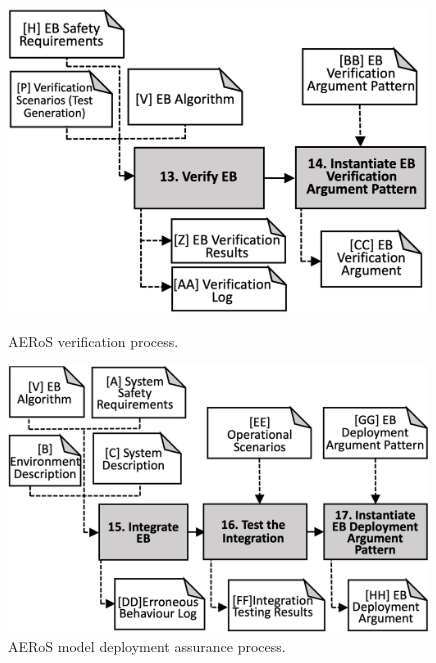 \documentclass[runningheads]{llncs}
\begin{document}
\vspace{-4ex}
\begin{figure}[!h]
\centering
\begin{minipage}{.5\textwidth}
	\centering
	\includegraphics[width=0.99\textwidth]{figures/AMLAS-STAGE-5-V4.png}%
	\vspace{-2ex}
	\caption{AERoS verification process.}
	\label{amlas-a-stage5}
\end{minipage}%
\begin{minipage}{.5\textwidth}
	\centering
	\includegraphics[width=0.99\textwidth]{figures/AMLAS-STAGE-6-V5.png}%
	\vspace{-2ex}
	\caption{AERoS model deployment assurance process.}
	\label{amlas-a-stage6}
\end{minipage}
\vspace{-4ex}
\end{figure}
\end{document}
